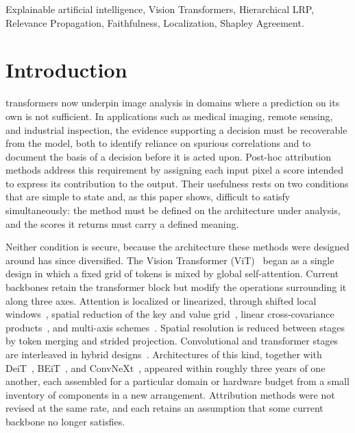 \documentclass[lettersize,journal]{IEEEtran}
\theoremstyle{definition}
\theoremstyle{plain}
\begin{document}
\begin{IEEEkeywords}
Explainable artificial intelligence, Vision Transformers, Hierarchical LRP, Relevance Propagation, Faithfulness, Localization, Shapley Agreement.
\end{IEEEkeywords}

\section{Introduction}
\label{sec:introduction}
 transformers now underpin image analysis in domains where
a prediction on its own is not sufficient. In applications such as medical
imaging, remote sensing, and industrial inspection, the evidence supporting a
decision must be recoverable from the model, both to identify reliance on
spurious correlations and to document the basis of a decision before it is
acted upon. Post-hoc attribution methods address this requirement by assigning
each input pixel a score intended to express its contribution to the output.
Their usefulness rests on two conditions that are simple to state and, as this
paper shows, difficult to satisfy simultaneously: the method must be defined on
the architecture under analysis, and the scores it returns must carry a defined
meaning.

Neither condition is secure, because the architecture these methods were
designed around has since diversified. The Vision Transformer
(ViT)~\cite{dosovitskiy2021vit} began as a single design in which a fixed grid
of tokens is mixed by global self-attention. Current backbones retain the
transformer block but modify the operations surrounding it along three axes.
Attention is localized or linearized, through shifted local
windows~\cite{liu2021swin}, spatial reduction of the key and value
grid~\cite{wang2021pvt}, linear cross-covariance
products~\cite{cai2023efficientvit}, and multi-axis
schemes~\cite{tu2022maxvit}. Spatial resolution is reduced between stages by
token merging and strided projection. Convolutional and transformer stages are
interleaved in hybrid designs~\cite{mehta2022mobilevitv2}. Architectures of this
kind, together with DeiT~\cite{touvron2021deit}, BEiT~\cite{bao2022beit}, and
ConvNeXt~\cite{liu2022convnext}, appeared within roughly three years of one
another, each assembled for a particular domain or hardware budget from a small
inventory of components in a new arrangement. Attribution methods were not
revised at the same rate, and each retains an assumption that some current
backbone no longer satisfies.
\end{document}
